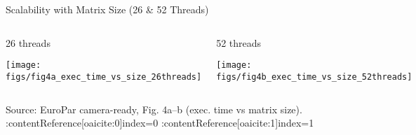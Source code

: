 \begin{frame}{Scalability with Matrix Size (26 \& 52 Threads)}
\small
\begin{columns}[T,onlytextwidth]
  \begin{block}{26 threads}

    \centering
    \texttt{[image: figs/fig4a\_exec\_time\_vs\_size\_26threads]}%
  \end{block}

  \begin{block}{52 threads}

    \centering
    \texttt{[image: figs/fig4b\_exec\_time\_vs\_size\_52threads]}%
  \end{block}
\end{columns}

\vspace{1mm}
{\scriptsize Source: EuroPar camera-ready, Fig. 4a–b (exec. time vs matrix size).  :contentReference[oaicite:0]{index=0}  :contentReference[oaicite:1]{index=1} }
\end{frame}
